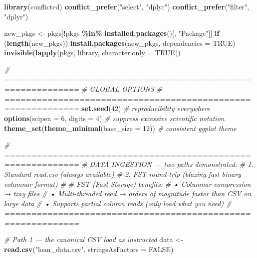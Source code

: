 \documentclass[
]{article}
\newenvironment{Shaded}{\begin{snugshade}}{\end{snugshade}}
\newcommand{\AttributeTok}[1]{\textcolor[rgb]{0.13,0.29,0.53}{#1}}
\newcommand{\CommentTok}[1]{\textcolor[rgb]{0.56,0.35,0.01}{\textit{#1}}}
\newcommand{\ConstantTok}[1]{\textcolor[rgb]{0.56,0.35,0.01}{#1}}
\newcommand{\ControlFlowTok}[1]{\textcolor[rgb]{0.13,0.29,0.53}{\textbf{#1}}}
\newcommand{\DecValTok}[1]{\textcolor[rgb]{0.00,0.00,0.81}{#1}}
\newcommand{\FunctionTok}[1]{\textcolor[rgb]{0.13,0.29,0.53}{\textbf{#1}}}
\newcommand{\NormalTok}[1]{#1}
\newcommand{\OtherTok}[1]{\textcolor[rgb]{0.56,0.35,0.01}{#1}}
\newcommand{\SpecialCharTok}[1]{\textcolor[rgb]{0.81,0.36,0.00}{\textbf{#1}}}
\newcommand{\StringTok}[1]{\textcolor[rgb]{0.31,0.60,0.02}{#1}}
\begin{document}
\begin{Shaded}
\begin{Highlighting}[]
\FunctionTok{library}\NormalTok{(conflicted)}
\FunctionTok{conflict\_prefer}\NormalTok{(}\StringTok{"select"}\NormalTok{, }\StringTok{"dplyr"}\NormalTok{)}
\FunctionTok{conflict\_prefer}\NormalTok{(}\StringTok{"filter"}\NormalTok{, }\StringTok{"dplyr"}\NormalTok{)}

\NormalTok{new\_pkgs }\OtherTok{\textless{}{-}}\NormalTok{ pkgs[}\SpecialCharTok{!}\NormalTok{pkgs }\SpecialCharTok{\%in\%} \FunctionTok{installed.packages}\NormalTok{()[, }\StringTok{"Package"}\NormalTok{]]}
\ControlFlowTok{if}\NormalTok{ (}\FunctionTok{length}\NormalTok{(new\_pkgs)) }\FunctionTok{install.packages}\NormalTok{(new\_pkgs, }\AttributeTok{dependencies =} \ConstantTok{TRUE}\NormalTok{)}
\FunctionTok{invisible}\NormalTok{(}\FunctionTok{lapply}\NormalTok{(pkgs, library, }\AttributeTok{character.only =} \ConstantTok{TRUE}\NormalTok{))}

\CommentTok{\# ============================================================}
\CommentTok{\#  GLOBAL OPTIONS}
\CommentTok{\# ============================================================}
\FunctionTok{set.seed}\NormalTok{(}\DecValTok{42}\NormalTok{)                        }\CommentTok{\# reproducibility everywhere}
\FunctionTok{options}\NormalTok{(}\AttributeTok{scipen =} \DecValTok{6}\NormalTok{, }\AttributeTok{digits =} \DecValTok{4}\NormalTok{)     }\CommentTok{\# suppress excessive scientific notation}
\FunctionTok{theme\_set}\NormalTok{(}\FunctionTok{theme\_minimal}\NormalTok{(}\AttributeTok{base\_size =} \DecValTok{12}\NormalTok{))  }\CommentTok{\# consistent ggplot theme}

\CommentTok{\# ============================================================}
\CommentTok{\#  DATA INGESTION  — two paths demonstrated:}
\CommentTok{\#    1. Standard read.csv  (always available)}
\CommentTok{\#    2. FST round{-}trip     (blazing fast binary columnar format)}
\CommentTok{\#}
\CommentTok{\#  FST (Fast Storage) benefits:}
\CommentTok{\#    • Columnar compression  → tiny files}
\CommentTok{\#    • Multi{-}threaded read   → orders of magnitude faster than CSV on large data}
\CommentTok{\#    • Supports partial column reads (only load what you need)}
\CommentTok{\# ============================================================}

\CommentTok{\# Path 1 — the canonical CSV load as instructed}
\NormalTok{data }\OtherTok{\textless{}{-}} \FunctionTok{read.csv}\NormalTok{(}\StringTok{"loan\_data.csv"}\NormalTok{, }\AttributeTok{stringsAsFactors =} \ConstantTok{FALSE}\NormalTok{)}


\end{Highlighting}
\end{Shaded}
\end{document}
